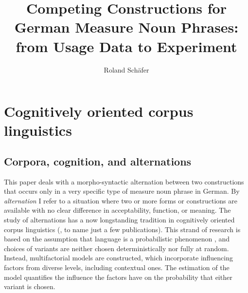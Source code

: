 \documentclass[USenglish]{article}
\begin{document}

  \author*[1]{Roland Schäfer}
  \title{Competing Constructions for German Measure Noun Phrases: from Usage Data to Experiment}
  \abstract{}


  
\maketitle





\section{Cognitively oriented corpus linguistics}
\label{sec:cogocl}

\subsection{Corpora, cognition, and alternations}

This paper deals with a morpho-syntactic alternation between two constructions that occurs only in a very specific type of measure noun phrase in German.
By \textit{alternation} I refer to a situation where two or more forms or constructions are available with no clear difference in acceptability, function, or meaning.
The study of alternations has a now longstanding tradition in cognitively oriented corpus linguistics (\citealp{BresnanEa2007,BresnanHay2010,BresnanFord2010,DivjakArppe2013,Gries2015,NessetJanda2010}, to name just a few publications).
This strand of research is based on the assumption that language is a probabilistic phenomenon \cite{Bresnan2007}, and choices of variants are neither chosen deterministically nor fully at random.
Instead, multifactorial models are constructed, which incorporate influencing factors from diverse levels, including contextual ones.
The estimation of the model quantifies the influence the factors have on the probability that either variant is chosen.
\end{document}
